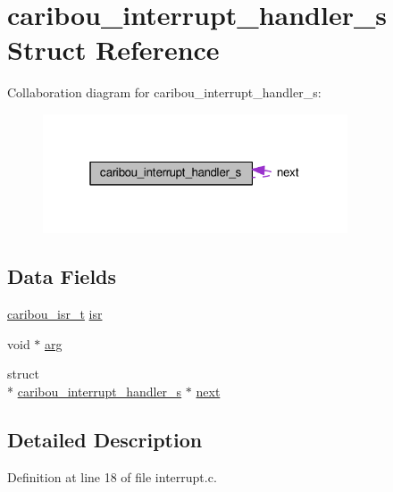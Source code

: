 \hypertarget{structcaribou__interrupt__handler__s}{\section{caribou\-\_\-interrupt\-\_\-handler\-\_\-s Struct Reference}
\label{structcaribou__interrupt__handler__s}
}


Collaboration diagram for caribou\-\_\-interrupt\-\_\-handler\-\_\-s\-:\nopagebreak
\begin{figure}[H]
\begin{center}
\leavevmode
\includegraphics[width=256pt]{structcaribou__interrupt__handler__s__coll__graph}
\end{center}
\end{figure}
\subsection*{Data Fields}
\begin{DoxyCompactItemize}
\item 
\hyperlink{interrupt_8h_af609f1916308a4ac8148b51cad03f620}{caribou\-\_\-isr\-\_\-t} \hyperlink{structcaribou__interrupt__handler__s_aecb54a9629094e45d0de339021c6a1a0}{isr}
\item 
void $\ast$ \hyperlink{structcaribou__interrupt__handler__s_aefaec04418af509f17589f6e3ed6ff0e}{arg}
\item 
struct \\*
\hyperlink{structcaribou__interrupt__handler__s}{caribou\-\_\-interrupt\-\_\-handler\-\_\-s} $\ast$ \hyperlink{structcaribou__interrupt__handler__s_a0d58e1ee1f99080457360177c803b034}{next}
\end{DoxyCompactItemize}


\subsection{Detailed Description}


Definition at line 18 of file interrupt.\-c.



